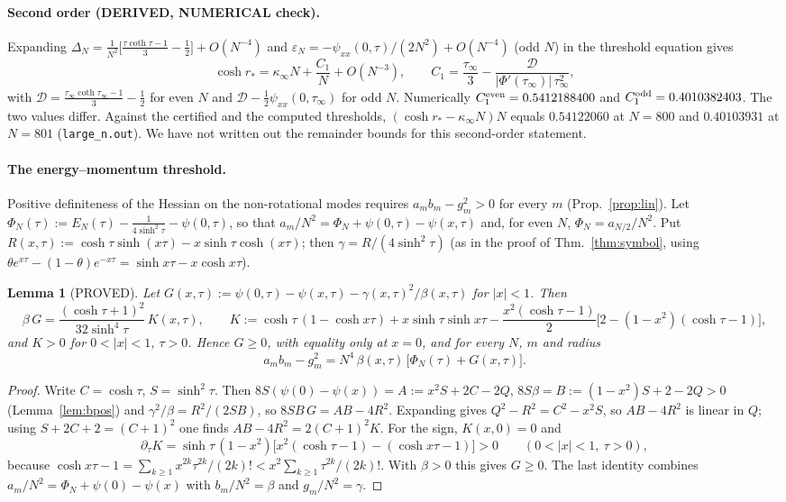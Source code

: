 \documentclass[11pt]{article}
\newtheorem{lemma}[theorem]{Lemma}
\theoremstyle{remark}
\begin{document}
\paragraph{Second order (DERIVED, NUMERICAL check).} Expanding $\Delta_N=\frac1{N^2}\big[\frac{\tau\coth\tau-1}3-\frac12\big]+O(N^{-4})$
and $\varepsilon_N=-\psi_{xx}(0,\tau)/(2N^2)+O(N^{-4})$ (odd $N$) in the threshold equation gives
\[
\cosh r_*=\kappa_\infty N+\frac{C_1}N+O(N^{-3}),\qquad C_1=\frac{\tau_\infty}3-\frac{\mathcal D}{|\Phi'(\tau_\infty)|\,\tau_\infty^2},
\]
with $\mathcal D=\frac{\tau_\infty\coth\tau_\infty-1}3-\frac12$ for even $N$ and $\mathcal D-\frac12\psi_{xx}(0,\tau_\infty)$ for odd $N$.
Numerically $C_1^{\rm even}=0.5412188400$ and $C_1^{\rm odd}=0.4010382403$. The two values differ. Against the certified and the computed thresholds,
$(\cosh r_*-\kappa_\infty N)N$ equals $0.54122060$ at $N=800$ and $0.40103931$ at $N=801$ (\texttt{large\_n.out}). We have
not written out the remainder bounds for this second-order statement.

\paragraph{The energy--momentum threshold.} Positive definiteness of the Hessian on the non-rotational modes requires
$a_mb_m-g_m^2>0$ for every $m$ (Prop.~\ref{prop:lin}). Let $\Phi_N(\tau):=E_N(\tau)-\frac1{4\sinh^2\tau}-\psi(0,\tau)$, so that
$a_m/N^2=\Phi_N+\psi(0,\tau)-\psi(x,\tau)$ and, for even $N$, $\Phi_N=a_{N/2}/N^2$. Put
$R(x,\tau):=\cosh\tau\sinh(x\tau)-x\sinh\tau\cosh(x\tau)$; then $\gamma=R/(4\sinh^2\tau)$ (as in the proof of
Thm.~\ref{thm:symbol}, using $\theta e^{x\tau}-(1-\theta)e^{-x\tau}=\sinh x\tau-x\cosh x\tau$).

\begin{lemma}[PROVED]\label{lem:em}
Let $G(x,\tau):=\psi(0,\tau)-\psi(x,\tau)-\gamma(x,\tau)^2/\beta(x,\tau)$ for $|x|<1$. Then
\[
\beta\,G=\frac{(\cosh\tau+1)^2}{32\sinh^4\tau}\,K(x,\tau),\qquad
K:=\cosh\tau\,(1-\cosh x\tau)+x\sinh\tau\sinh x\tau-\frac{x^2(\cosh\tau-1)}2\big[2-(1-x^2)(\cosh\tau-1)\big],
\]
and $K>0$ for $0<|x|<1$, $\tau>0$. Hence $G\ge0$, with equality only at $x=0$, and for every $N$, $m$ and radius
\[
a_mb_m-g_m^2=N^4\,\beta(x,\tau)\,\big[\Phi_N(\tau)+G(x,\tau)\big].
\]
\end{lemma}
\begin{proof}
Write $C=\cosh\tau$, $S=\sinh^2\tau$. Then $8S(\psi(0)-\psi(x))=A:=x^2S+2C-2Q$, $8S\beta=B:=(1-x^2)S+2-2Q>0$
(Lemma~\ref{lem:bpos}) and $\gamma^2/\beta=R^2/(2SB)$, so $8SB\,G=AB-4R^2$. Expanding gives $Q^2-R^2=C^2-x^2S$, so
$AB-4R^2$ is linear in $Q$; using $S+2C+2=(C+1)^2$ one finds $AB-4R^2=2(C+1)^2K$. For the sign, $K(x,0)=0$ and
\[
\partial_\tau K=\sinh\tau\,(1-x^2)\big[x^2(\cosh\tau-1)-(\cosh x\tau-1)\big]>0\qquad(0<|x|<1,\ \tau>0),
\]
because $\cosh x\tau-1=\sum_{k\ge1}x^{2k}\tau^{2k}/(2k)!<x^2\sum_{k\ge1}\tau^{2k}/(2k)!$. With $\beta>0$ this gives
$G\ge0$. The last identity combines
$a_m/N^2=\Phi_N+\psi(0)-\psi(x)$ with $b_m/N^2=\beta$ and $g_m/N^2=\gamma$.
\end{proof}
\end{document}
